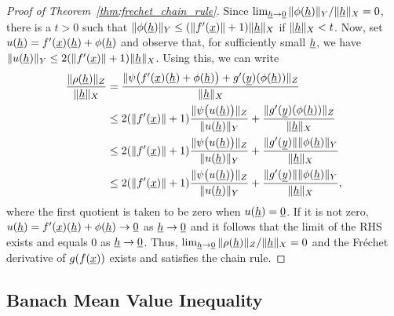 \begin{proof}[Proof of Theorem~\ref{thm:frechet_chain_rule}]
Since $\lim_{\underline{h} \to \underline{0}} \| \phi (\underline{h}) \|_Y / \|\underline{h}\|_X = 0$, there is a $t>0$ such that $\|\phi(\underline{h})\|_Y \leq (\|f'(\underline{x})\|+1) \|\underline{h}\|_X$ if $\|\underline{h}\|_X < t$.
Now, set $u(\underline h)=f'(\underline x)(\underline h)+\phi(\underline h)$ and observe that, for sufficiently small $\underline h$, we have $\| u(\underline h)\|_Y\leq 2(\|f'(\underline x)\|+1)\|\underline h\|_X$.
Using this, we can write
\begin{align*}
\frac{\|\rho(\underline{h})\|_Z}{\|\underline{h}\|_X}
&= \frac{\| \psi \big(f'(\underline{x})(\underline{h}) + \phi(\underline{h}) \big) + g'(\underline{y})(\phi(\underline{h})) \|_Z}{\|\underline{h}\|_X} \\
&\leq 2 (\|f'(\underline{x})\|+1)  \frac{\| \psi \big(u(\underline{h}) \big) \|_Z}{ \| u(\underline{h}) \|_Y } + \frac{\|  g'(\underline{y})(\phi(\underline{h})) \|_Z}{\|\underline{h}\|_X} \\
& \leq 2 (\|f'(\underline{x})\|+1) \frac{\| \psi \big( u(\underline{h}) \big) \|_Z}{\| u(\underline{h}) \|_Y} + \frac{\|  g'(\underline{y})\| \|\phi(\underline{h}) \|_Y}{\|\underline{h}\|_X} \\
& \leq 2 (\|f'(\underline{x})\|+1) \frac{\| \psi \big( u(\underline{h}) \big) \|_Z}{\| u(\underline{h}) \|_Y} + \frac{\|  g'(\underline{y})\| \|\phi(\underline{h}) \|_Y}{\|\underline{h}\|_X},
\end{align*}
where the first quotient is taken to be zero when $u(\underline h)=\underline0$.
If it is not zero, $u(\underline{h})=f'(\underline{x}) (\underline{h}) + \phi(\underline{h}) \to \underline{0}$ as $\underline{h}\to\underline{0}$ and it follows that the limit of the RHS exists and equals 0 as $\underline{h}\to\underline{0}$.
Thus, $\lim_{\underline{h} \to \underline{0}} \| \rho (\underline{h}) \|_Z / \|\underline{h}\|_X = 0$ and the Fr\'{e}chet derivative of $g(f(\underline{x}))$ exists and satisfies the chain rule.
\end{proof}

\subsection*{Banach Mean Value Inequality}

